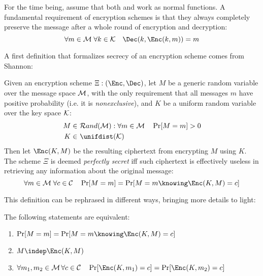 For the time being, assume that both \Enc{} and \Dec{} work as normal functions. A fundamental requirement of encryption schemes is that they always completely preserve the message after a whole round of encryption and decryption:
\[
    \forall m \in \M \; \forall k \in \K \quad \Dec(k, \Enc(k, m)) = m
\]

A first definition that formalizes secrecy of an encryption scheme comes from Shannon:

\begin{definition}
    Given an encryption scheme $\Xi: (\Enc, \Dec)$, let $M$ be a generic random variable over the message space $\mathcal{M}$, with the only requirement that all messages $m$ have positive probability (i.e. it is \emph{nonexclusive}), and $K$ be a uniform random variable over the key space $\mathcal{K}$:
    \begin{align*}
        M \in&\ \mathcal{R}and(\M) : \forall m \in \M \quad \Pr[M = m] > 0 \\
        K \in&\ \unifdist(\K)
    \end{align*}
    Then let $\Enc(K, M)$ be the resulting ciphertext from encrypting $M$ using $K$. The scheme $\Xi$ is deemed \emph{perfectly secret} iff such ciphertext is effectively useless in retrieving any information about the original message:
    \[
        \forall m \in \M \; \forall c \in \C \quad \Pr[M = m] = \Pr[M = m \knowing \Enc(K, M) = c]
    \]
\end{definition}

This definition can be rephrased in different ways, bringing more details to light:
    
\begin{proposition}
    The following statements are equivalent:
    \begin{enumerate}
        \item \label{def:ps1} $\Pr[M = m] = \Pr[M = m \knowing \Enc(K, M) = c]$
        \item \label{def:ps2} $M \indep \Enc(K, M)$
        \item \label{def:ps3} $\forall m_1, m_2 \in \M \, \forall c \in \C \quad \Pr[\Enc(K, m_1) = c] = \Pr[\Enc(K, m_2) = c]$
    \end{enumerate}
\end{proposition}

